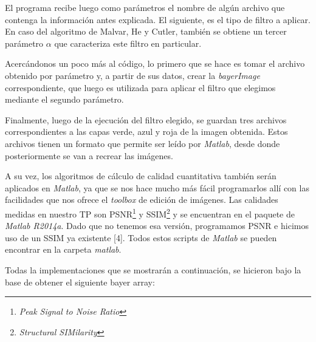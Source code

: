 \vspace{\baselineskip}

El programa recibe luego como parámetros el nombre de algún archivo que contenga la información antes explicada. El siguiente, es el tipo de filtro a aplicar. En caso del algoritmo de Malvar, He y Cutler, también se obtiene un tercer parámetro \textbf{$\alpha$} que caracteriza este filtro en particular.

\vspace{\baselineskip}

Acercándonos un poco más al código, lo primero que se hace es tomar el archivo obtenido por parámetro y, a partir de sus datos, crear la \textit{bayerImage} correspondiente, que luego es utilizada para aplicar el filtro que elegimos mediante el segundo parámetro.

\vspace{\baselineskip}

Finalmente, luego de la ejecución del filtro elegido, se guardan tres archivos correspondientes a las capas verde, azul y roja de la imagen obtenida. Estos archivos tienen un formato que permite ser leído por \textit{Matlab}, desde donde posteriormente se van a recrear las imágenes.

\vspace{\baselineskip}

A su vez, los algoritmos de cálculo de calidad cuantitativa también serán aplicados en \textit{Matlab}, ya que se nos hace mucho más fácil programarlos allí con las facilidades que nos ofrece el \textit{toolbox} de edición de imágenes. Las calidades medidas en nuestro TP son PSNR\footnote{\textit{Peak Signal to Noise Ratio}} y SSIM\footnote{\textit{Structural SIMilarity}} y se encuentran en el paquete de \textit{Matlab R2014a}. Dado que no tenemos esa versión, programamos PSNR e hicimos uso de un SSIM ya existente [4]. Todos estos scripts de \textit{Matlab} se pueden encontrar en la carpeta \textit{matlab}.

\vspace{2\baselineskip}

Todas la implementaciones que se mostrarán a continuación, se hicieron bajo la base de obtener el siguiente bayer array:


